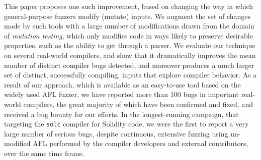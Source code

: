   This paper proposes one such improvement, based on changing the way
  in which general-purpose fuzzers modify (mutate) inputs.  We augment
  the set of changes made by such tools with a large number of
  modifications drawn from the domain of \emph{mutation testing},
  which only modifies code in ways likely to preserve desirable
  properties, such as the ability to get through a parser.  We evaluate
  our technique on several real-world compilers, and show that it
  dramatically improves the mean number of distinct compiler bugs
  detected, and moreover produces a much larger set of distinct,
  successfully compiling, inputs that explore compiler behavior.  As a
  result of our approach, which is available as an easy-to-use tool
  based on the widely used AFL fuzzer, we have reported more than 100
  bugs in important real-world compilers, the great majority of
  which have been confirmed and fixed, and received a bug bounty for
  our efforts.  In the longest-running campaign, that targeting the
  {\tt solc} compiler for Solidity code, we were the first to
  report a very large number of serious bugs, despite continuous, extensive
  fuzzing using un-modified AFL performed by the compiler developers
  and external contributors, over the same time frame.
